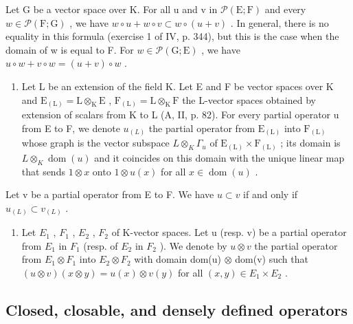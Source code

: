 Let G be a vector space over K. For all u and v in \(\mathcal{P}(\mathrm{E};\mathrm{F})\) and every \(w \in \mathcal{P}(\mathrm{F};\mathrm{G})\) , we have \(w \circ u + w \circ v \subset w \circ (u + v)\) . In general, there is no equality in this formula (exercise 1 of IV, p. 344), but this is the case when the domain of w is equal to F. For \(w \in \mathcal{P}(\mathrm{G};\mathrm{E})\) , we have \(u \circ w + v \circ w = (u + v) \circ w\) .

\begin{enumerate}
\def\labelenumi{(\roman{enumi})}
\setcounter{enumi}{6}
\tightlist
\item
  Let L be an extension of the field K. Let E and F be vector spaces over K and \(\mathrm{E}_{(\mathrm{L})} = \mathrm{L} \otimes_{\mathrm{K}} \mathrm{E}\) , \(\mathrm{F}_{(\mathrm{L})} = \mathrm{L} \otimes_{\mathrm{K}} \mathrm{F}\) the L-vector spaces obtained by extension of scalars from K to L (A, II, p. 82). For every partial operator u from E to F, we denote \(u_{(L)}\) the partial operator from \(\mathrm{E}_{(\mathrm{L})}\) into \(\mathrm{F}_{(\mathrm{L})}\) whose graph is the vector subspace \(L \otimes_{K} \Gamma_{u}\) of \(\mathrm{E}_{(\mathrm{L})} \times \mathrm{F}_{(\mathrm{L})}\) ; its domain is \(L \otimes_{K} \operatorname{dom}(u)\) and it coincides on this domain with the unique linear map that sends \(1 \otimes x\) onto \(1 \otimes u(x)\) for all \(x \in \operatorname{dom}(u)\) .
\end{enumerate}

Let v be a partial operator from E to F. We have \(u \subset v\) if and only if \(u_{(L)} \subset v_{(L)}\) .

\begin{enumerate}
\def\labelenumi{(\roman{enumi})}
\setcounter{enumi}{7}
\tightlist
\item
  Let \(E_{1}\) , \(F_{1}\) , \(E_{2}\) , \(F_{2}\) of K-vector spaces. Let u (resp. v) be a partial operator from \(E_{1}\) in \(F_{1}\) (resp. of \(E_{2}\) in \(F_{2}\) ). We denote by \(u \otimes v\) the partial operator from \(E_{1} \otimes F_{1}\) into \(E_{2} \otimes F_{2}\) with domain dom(u) \(\otimes\) dom(v) such that \((u \otimes v)(x \otimes y) = u(x) \otimes v(y)\) for all \((x, y) \in E_{1} \times E_{2}\) .
\end{enumerate}

\subsection{Closed, closable, and densely defined operators}

